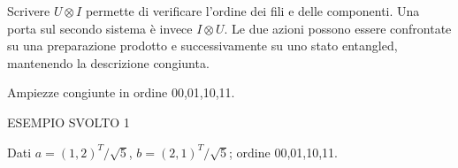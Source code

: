 Scrivere \(U\otimes I\) permette di verificare l'ordine dei fili e delle componenti. Una porta sul secondo sistema è invece \(I\otimes U\). Le due azioni possono essere confrontate su una preparazione prodotto e successivamente su uno stato entangled, mantenendo la descrizione congiunta.\par



Ampiezze congiunte in ordine 00,01,10,11.\par


\Needspace{.36\textheight}\label{c2-porte-locali-example-1}
{\sffamily\small\color{Accent} ESEMPIO SVOLTO 1\par}
Dati \(a=(1{,}2)^{T}/\sqrt{5}\), \(b=(2{,}1)^{T}/\sqrt{5}\); ordine 00,01,10,11.\par


